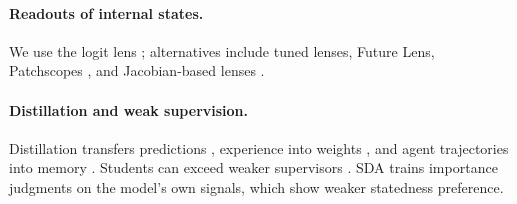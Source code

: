 \paragraph{Readouts of internal states.}
We use the logit lens \citep{nostalgebraist2020logitlens}; alternatives include tuned lenses, Future Lens, Patchscopes \citep{belrose2023tuned,pal2023futurelens,ghandeharioun2024patchscopes}, and Jacobian-based lenses \citep{anthropic2026workspace}.

\paragraph{Distillation and weak supervision.}
Distillation transfers predictions \citep{hinton2015distilling,furlanello2018bornagain}, experience into weights \citep{tmem2026}, and agent trajectories into memory \citep{amd2026}. Students can exceed weaker supervisors \citep{burns2023weak}. SDA trains importance judgments on the model's own signals, which show weaker statedness preference.

